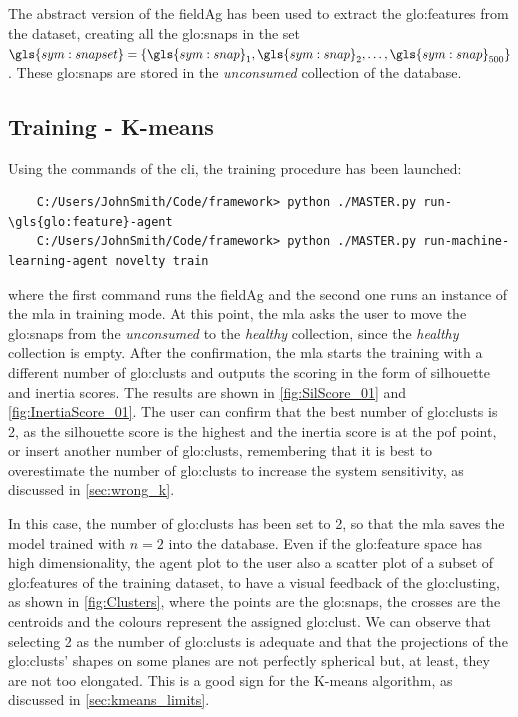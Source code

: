 The abstract version of the \gls{fieldAg} has been used to extract the \gls{glo:feature}s from the dataset, creating all the \gls{glo:snap}s in the set $\gls{sym:snapset}=\{\gls{sym:snap}_1,\gls{sym:snap}_2,\dots,\gls{sym:snap}_{500}\}$. These \gls{glo:snap}s are stored in the \emph{unconsumed} collection of the database.

\subsection{Training - K-means}

Using the commands of the \gls{cli}, the training procedure has been launched:
\begin{verbatim}
    C:/Users/JohnSmith/Code/framework> python ./MASTER.py run-\gls{glo:feature}-agent
    C:/Users/JohnSmith/Code/framework> python ./MASTER.py run-machine-learning-agent novelty train
\end{verbatim}

where the first command runs the \gls{fieldAg} and the second one runs an  instance of the \gls{mla} in training mode.
At this point, the \gls{mla} asks the user to move the \gls{glo:snap}s from the \emph{unconsumed} to the \emph{healthy} collection, since the \emph{healthy} collection is empty. After the confirmation, the \gls{mla} starts the training with a different number of \gls{glo:clust}s and outputs the scoring in the form of silhouette and inertia scores. The results are shown in \autoref{fig:SilScore_01} and \autoref{fig:InertiaScore_01}. The user can confirm that the best number of \gls{glo:clust}s is 2, as the silhouette score is the highest and the inertia score is at the \gls{pof} point, or insert another number of \gls{glo:clust}s, remembering that it is best to overestimate the number of \gls{glo:clust}s to increase the system sensitivity, as discussed in \autoref{sec:wrong_k}. 

In this case, the number of \gls{glo:clust}s has been set to 2, so that the \gls{mla} saves the model trained with $n=2$ into the database. Even if the \gls{glo:feature} space has high dimensionality, the agent plot to the user also a scatter plot of a subset of \gls{glo:feature}s of the training dataset, to have a visual feedback of the \gls{glo:clust}ing, as shown in \autoref{fig:Clusters}, where the points are the \gls{glo:snap}s, the crosses are the centroids and the colours represent the assigned \gls{glo:clust}. We can observe that selecting 2 as the number of \gls{glo:clust}s is adequate and that the projections of the \gls{glo:clust}s' shapes on some planes are not perfectly spherical but, at least, they are not too elongated. This is a good sign for the K-means algorithm, as discussed in \autoref{sec:kmeans_limits}.

